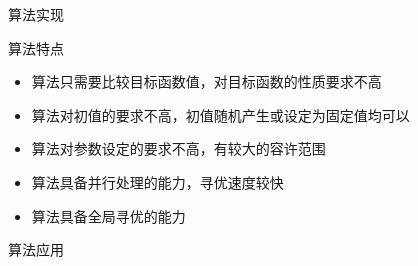 \documentclass[UTF8]{ctexart}
\begin{document}
\begin{section}{算法实现}
\begin{subsection}{算法特点}
\begin{itemize}
\item{算法只需要比较目标函数值，对目标函数的性质要求不高}
\item{算法对初值的要求不高，初值随机产生或设定为固定值均可以}
\item{算法对参数设定的要求不高，有较大的容许范围}
\item{算法具备并行处理的能力，寻优速度较快}
\item{算法具备全局寻优的能力}
\end{itemize}
\end{subsection}

\end{section}

\begin{section}{算法应用}


\end{section}
\end{document}
